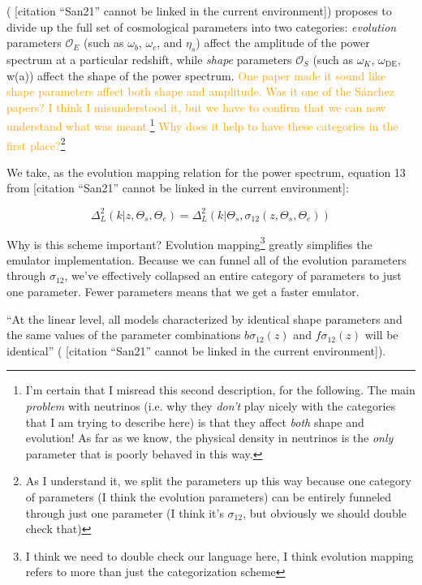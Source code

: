 \documentclass[11pt]{article}
\newcommand{\cbib}[1]
{\IfFileExists{biblatex.sty}
{\cite{#1}}
{[citation ``#1'' cannot be linked in the current environment]}}
\begin{document}
(\cbib{San21}) proposes to divide up the full set of cosmological
parameters into two categories: \textit{evolution} parameters $\mathcal{O}_E$
(such as $\omega_b$, $\omega_c$, and $\eta_s$)
affect the amplitude of the power spectrum at a particular redshift, while
\textit{shape} parameters $\mathcal{O}_S$
(such as $\omega_K$, $\omega_\text{DE}$, w(a))
affect the shape of the power
spectrum. \textcolor{orange}{One paper made it sound like shape parameters
affect both shape and amplitude. Was it one of the S\'{a}nchez papers? I think
I misunderstood it, but we have to confirm that we can now understand what was
meant.\footnote{
    I'm certain that I misread this second description, for the following.
    The main \textit{problem} with neutrinos (i.e. why they \textit{don't}
    play nicely with the categories that I am trying to describe here)
    is that they affect \textit{both} shape and evolution! As far as we know,
    the physical density in neutrinos is the \textit{only} parameter that
    is poorly behaved in this way.
}
Why does it help to have these categories in the first place?}\footnote{
    As I understand it, we split the parameters up this way because
    one category of parameters (I think the evolution parameters)
    can be entirely funneled through just one parameter
    (I think it's $\sigma_{12}$, but obviously we should double check that)
}

We take, as the evolution mapping relation for the power spectrum, equation 13
from \cbib{San21}:

\begin{equation}
\label{eq: evMapping_pSpectrum}
    \Delta^2_L (k | z, \Theta_s, \Theta_e)
    =
    \Delta_L^2 (k | \Theta_s, \sigma_{12} \left( z, \Theta_s, \Theta_e \right))
\end{equation}

Why is this scheme important? Evolution mapping\footnote{I think we need to
double check our language here, I think evolution mapping refers to more than
just the categorization scheme} greatly simplifies the emulator
implementation. Because we can
funnel all of the evolution parameters through $\sigma_{12}$, we've effectively
collapsed an entire category of parameters to just one parameter. Fewer
parameters means that we get a faster emulator.

``At the linear level, all models characterized by identical shape parameters
and the same values of the parameter combinations $b \sigma_{12}(z)$ and
$f \sigma_{12}(z)$ will be identical'' (\cbib{San21}).
\end{document}
